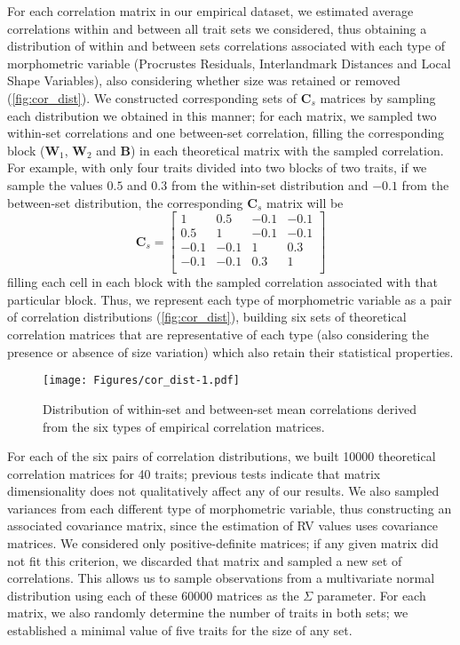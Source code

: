 \documentclass[12pt,]{article}
\begin{document}
For each correlation matrix in our empirical dataset, we estimated
average correlations within and between all trait sets we considered,
thus obtaining a distribution of within and between sets correlations
associated with each type of morphometric variable (Procrustes
Residuals, Interlandmark Distances and Local Shape Variables), also
considering whether size was retained or removed
(\autoref{fig:cor_dist}). We constructed corresponding sets of
$\mathbf{C}_{s}$ matrices by sampling each distribution we obtained in
this manner; for each matrix, we sampled two within-set correlations and
one between-set correlation, filling the corresponding block
($\mathbf{W}_1$, $\mathbf{W}_2$ and $\mathbf{B}$) in each theoretical
matrix with the sampled correlation. For example, with only four traits
divided into two blocks of two traits, if we sample the values $0.5$ and
$0.3$ from the within-set distribution and $-0.1$ from the between-set
distribution, the corresponding $\mathbf{C}_{s}$ matrix will be \[
\mathbf{C}_s =
\begin{bmatrix}
1 & 0.5 & -0.1 & -0.1 \\
0.5 & 1 & -0.1 & -0.1 \\
-0.1 & -0.1 & 1 & 0.3 \\
-0.1 & -0.1 & 0.3 & 1 \\
\end{bmatrix}
\] filling each cell in each block with the sampled correlation
associated with that particular block. Thus, we represent each type of
morphometric variable as a pair of correlation distributions
(\autoref{fig:cor_dist}), building six sets of theoretical correlation
matrices that are representative of each type (also considering the
presence or absence of size variation) which also retain their
statistical properties.

\begin{figure}[htbp]
\centering
\texttt{[image: Figures/cor\_dist-1.pdf]}
\caption{Distribution of within-set and between-set mean correlations
derived from the six types of empirical correlation matrices.
\label{fig:cor_dist}}
\end{figure}

For each of the six pairs of correlation distributions, we built 10000
theoretical correlation matrices for 40 traits; previous tests indicate
that matrix dimensionality does not qualitatively affect any of our
results. We also sampled variances from each different type of
morphometric variable, thus constructing an associated covariance
matrix, since the estimation of RV values uses covariance matrices. We
considered only positive-definite matrices; if any given matrix did not
fit this criterion, we discarded that matrix and sampled a new set of
correlations. This allows us to sample observations from a multivariate
normal distribution using each of these 60000 matrices as the $\Sigma$
parameter. For each matrix, we also randomly determine the number of
traits in both sets; we established a minimal value of five traits for
the size of any set.
\end{document}
